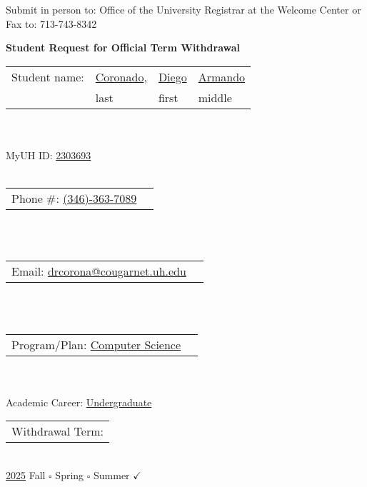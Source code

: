 \documentclass[11.5pt]{article}
\makeatletter
\newcommand{\lastName}{Coronado}
\newcommand{\firstName}{Diego}
\newcommand{\middleName}{Armando}
\newcommand{\studentID}{2303693}
\newcommand{\phoneNumber}{(346)-363-7089}
\newcommand{\emailAddress}{drcorona@cougarnet.uh.edu}
\newcommand{\programPlan}{Computer Science}
\newcommand{\academicCareer}{Undergraduate}
\newcommand{\withdrawalYear}{2025}
\newcommand{\seasonFall}{\square}
\newcommand{\seasonSpring}{\square}
\newcommand{\seasonSummer}{\checkmark}
\makeatother
\begin{document}
\thispagestyle{empty}

\begin{minipage}{1\textwidth}
  Submit in person to:
  Office of the University Registrar at
  the Welcome Center
  or
  Fax to: 713-743-8342
\end{minipage}

\begin{center}
  \textbf{\Large Student Request for Official Term Withdrawal}
\end{center}

\noindent\begin{tabular}{@{}p{1.2in}p{1in}p{1in}p{1in}@{}} 
Student name: & \underline{\lastName}, & \underline{\firstName} & \underline{\middleName}\\
 & \scriptsize{last} & \scriptsize{first} & \scriptsize{middle}\\
\end{tabular}
\\\\
\hfill MyUH ID: \underline{\studentID}
\\\\
\noindent\begin{tabular}{@{}p{2in}p{2in}@{}}
  Phone \#:   \underline{\phoneNumber} \\
\end{tabular}
\\\\
\noindent\begin{tabular}{@{}p{3in}p{4.5in}@{}}
Email: \underline{\emailAddress} \\
\end{tabular}
\\\\
\noindent\begin{tabular}{@{}p{3in}p{4.5in}@{}}
Program/Plan:  \underline{\programPlan} \\
\end{tabular}
\\\\
\hfill Academic Career: \underline{\academicCareer}
\\

\noindent\begin{tabular}{@{}p{1.8in}@{}}
Withdrawal Term: \\
\end{tabular}
\\
\underline{\withdrawalYear} \hspace{0.2in} Fall $\seasonFall$ \hspace{0.2in} Spring $\seasonSpring$ \hspace{0.2in} Summer $\seasonSummer$
\end{document}
